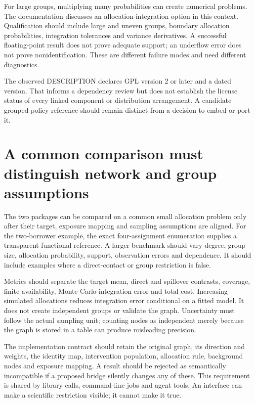 For large groups, multiplying many probabilities can create numerical problems.
The documentation discusses an allocation-integration option in this context.
Qualification should include large and uneven groups, boundary allocation
probabilities, integration tolerances and variance derivatives. A successful
floating-point result does not prove adequate support; an underflow error does
not prove nonidentification. These are different failure modes and need
different diagnostics.

The observed DESCRIPTION declares GPL version 2 or later and a dated version.
That informs a dependency review but does not establish the license status of
every linked component or distribution arrangement. A candidate grouped-policy
reference should remain distinct from a decision to embed or port it.

\section{A common comparison must distinguish network and group assumptions}

The two packages can be compared on a common small allocation problem only
after their target, exposure mapping and sampling assumptions are aligned.
For the two-borrower example, the exact four-assignment enumeration supplies a
transparent functional reference. A larger benchmark should vary degree,
group size, allocation probability, support, observation errors and dependence.
It should include examples where a direct-contact or group restriction is false.

Metrics should separate the target mean, direct and spillover contrasts,
coverage, finite availability, Monte Carlo integration error and total cost.
Increasing simulated allocations reduces integration error conditional on a
fitted model. It does not create independent groups or validate the graph.
Uncertainty must follow the actual sampling unit; counting nodes as independent
merely because the graph is stored in a table can produce misleading precision.

The implementation contract should retain the original graph, its direction
and weights, the identity map, intervention population, allocation rule,
background nodes and exposure mapping. A result should be rejected as
semantically incompatible if a proposed bridge silently changes any of these.
This requirement is shared by library calls, command-line jobs and agent tools.
An interface can make a scientific restriction visible; it cannot make it true.

